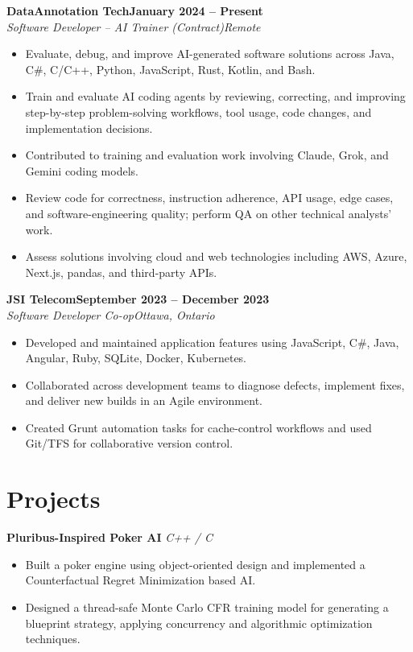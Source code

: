 \documentclass[10pt,letterpaper]{article}
\newcommand{\resumeEntry}[4]{
 \textbf{\color{heading}#1}\hfill \textbf{#2}\\[-1pt]
 \textit{#3}\hfill {\small\textit{#4}}\\[-3pt]
}
\begin{document}
\resumeEntry{DataAnnotation Tech}{January 2024 -- Present}{Software Developer -- AI Trainer (Contract)}{Remote}
\begin{itemize}
 \item Evaluate, debug, and improve AI-generated software solutions across Java, C\#, C/C++, Python, JavaScript, Rust, Kotlin, and Bash.
 \item Train and evaluate AI coding agents by reviewing, correcting, and improving step-by-step problem-solving workflows, tool usage, code changes, and implementation decisions.
 \item Contributed to training and evaluation work involving Claude, Grok, and Gemini coding models.
 \item Review code for correctness, instruction adherence, API usage, edge cases, and software-engineering quality; perform QA on other technical analysts' work.
 \item Assess solutions involving cloud and web technologies including AWS, Azure, Next.js, pandas, and third-party APIs.
\end{itemize}

\resumeEntry{JSI Telecom}{September 2023 -- December 2023}{Software Developer Co-op}{Ottawa, Ontario}
\begin{itemize}
 \item Developed and maintained application features using JavaScript, C\#, Java, Angular, Ruby, SQLite, Docker, Kubernetes.
 \item Collaborated across development teams to diagnose defects, implement fixes, and deliver new builds in an Agile environment.
 \item Created Grunt automation tasks for cache-control workflows and used Git/TFS for collaborative version control.
\end{itemize}

\section{Projects}

\textbf{Pluribus-Inspired Poker AI} \hfill \textit{C++ / C}
\begin{itemize}
 \item Built a poker engine using object-oriented design and implemented a Counterfactual Regret Minimization based AI.
 \item Designed a thread-safe Monte Carlo CFR training model for generating a blueprint strategy, applying concurrency and algorithmic optimization techniques.
\end{itemize}
\end{document}
